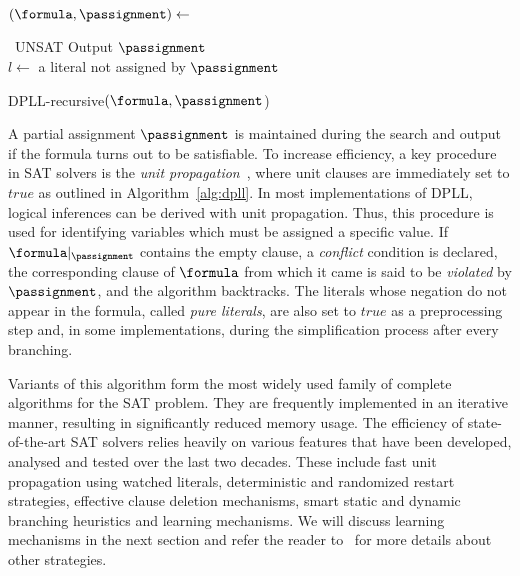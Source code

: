 \begin{algorithm}[htp]%
    \SetAlgoLined\DontPrintSemicolon%
    $(\formula, \passignment) \leftarrow$ \proc{$\formula,\passignment$}

    {\Return~UNSAT}
    {Output $\passignment$\\
    }
    $l \leftarrow$ a literal not assigned by $\passignment$

    {}

    \vspace{2mm}
    \setcounter{AlgoLine}{0}
    \caption{DPLL-recursive$(\formula, \passignment$)}%
    \label{alg:dpll}
\end{algorithm} 

A partial assignment $\passignment$ is maintained during the search and output if the
formula turns out to be satisfiable.  To increase efficiency, a key procedure in SAT
solvers is the \emph{unit propagation}~\cite{cdclchapter}, where unit clauses
are immediately set to $true$ as outlined in Algorithm~\ref{alg:dpll}. In most
implementations of DPLL, logical inferences can be derived with unit propagation.
Thus, this procedure is used for identifying variables which must be assigned
a specific value. If $\formula |_\passignment$ contains the empty clause, a
\emph{conflict} condition is declared, the corresponding clause of $\formula$
from which it came is said to be \emph{violated} by $\passignment$, and the algorithm
backtracks. The literals whose negation do not appear in the formula, called
\emph{pure literals}, are also set to $true$ as a preprocessing step and, in
some implementations, during the simplification process after every branching. 

Variants of this algorithm form the most widely used family of complete
algorithms for the SAT problem. They are frequently implemented in an iterative
manner, resulting in significantly reduced memory usage. The efficiency of
state-of-the-art SAT solvers relies heavily on various features that have been
developed, analysed and tested over the last two decades. These include fast
unit propagation using watched literals, deterministic and randomized restart
strategies, effective clause deletion mechanisms, smart static and dynamic
branching heuristics and learning mechanisms. We will discuss learning
mechanisms in the next section and refer the reader to~\cite{satchapter} for
more details about other strategies.

